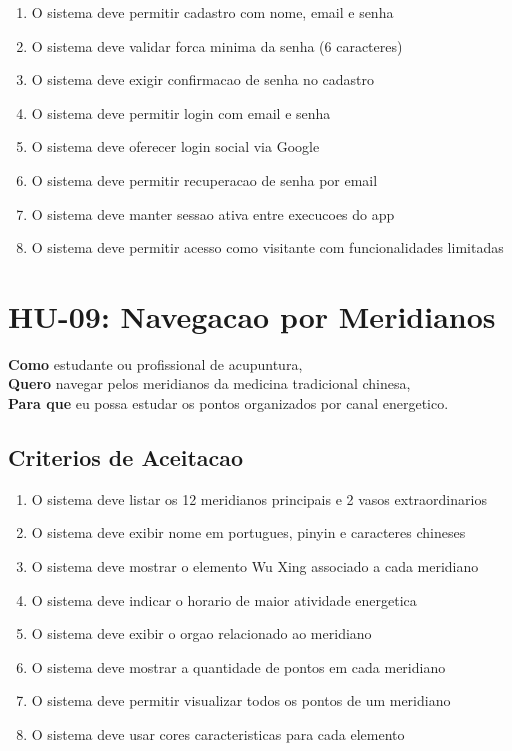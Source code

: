\begin{apendicesenv}
\begin{enumerate}
    \item O sistema deve permitir cadastro com nome, email e senha
    \item O sistema deve validar forca minima da senha (6 caracteres)
    \item O sistema deve exigir confirmacao de senha no cadastro
    \item O sistema deve permitir login com email e senha
    \item O sistema deve oferecer login social via Google
    \item O sistema deve permitir recuperacao de senha por email
    \item O sistema deve manter sessao ativa entre execucoes do app
    \item O sistema deve permitir acesso como visitante com funcionalidades limitadas
\end{enumerate}



\section{HU-09: Navegacao por Meridianos}
\label{hu:meridianos}

\textbf{Como} estudante ou profissional de acupuntura, \\
\textbf{Quero} navegar pelos meridianos da medicina tradicional chinesa, \\
\textbf{Para que} eu possa estudar os pontos organizados por canal energetico.

\subsection*{Criterios de Aceitacao}

\begin{enumerate}
    \item O sistema deve listar os 12 meridianos principais e 2 vasos extraordinarios
    \item O sistema deve exibir nome em portugues, pinyin e caracteres chineses
    \item O sistema deve mostrar o elemento Wu Xing associado a cada meridiano
    \item O sistema deve indicar o horario de maior atividade energetica
    \item O sistema deve exibir o orgao relacionado ao meridiano
    \item O sistema deve mostrar a quantidade de pontos em cada meridiano
    \item O sistema deve permitir visualizar todos os pontos de um meridiano
    \item O sistema deve usar cores caracteristicas para cada elemento
\end{enumerate}


\end{apendicesenv}
